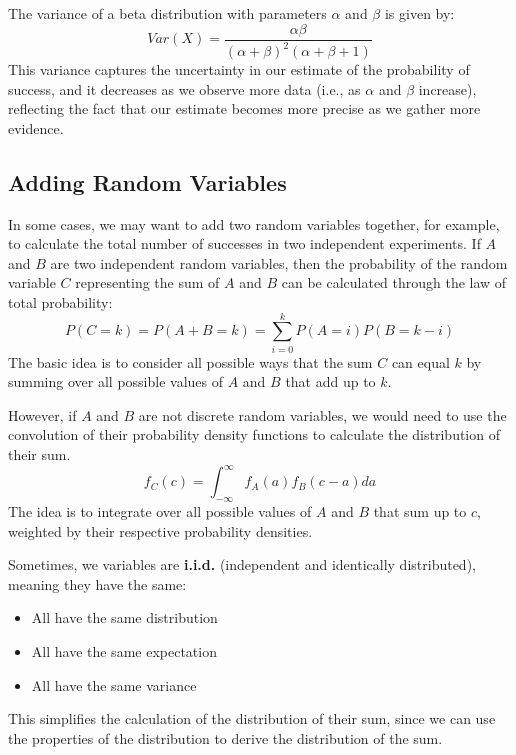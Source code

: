 The variance of a beta distribution with parameters $\alpha$ and $\beta$ is given by:
\begin{equation}
    Var(X) = \frac{\alpha \beta}{(\alpha + \beta)^2 (\alpha + \beta + 1)}
\end{equation}
This variance captures the uncertainty in our estimate of the probability of success, and it decreases as we observe more data (i.e., as $\alpha$ and $\beta$ increase), 
reflecting the fact that our estimate becomes more precise as we gather more evidence.

\subsection{Adding Random Variables}
In some cases, we may want to add two random variables together, for example, to calculate the total number of successes in two independent experiments.
If $A$ and $B$ are two independent random variables, then the probability of the random variable $C$ representing the sum of $A$ and $B$ can be calculated through the law of total probability:
\begin{equation}
    P(C=k) = P(A+B=k) = \sum_{i=0}^{k} P(A=i) P(B=k-i)
\end{equation}
The basic idea is to consider all possible ways that the sum $C$ can equal $k$ by summing over all possible values of $A$ and $B$ that add up to $k$.

However, if $A$ and $B$ are not discrete random variables, we would need to use the convolution of their probability density functions to calculate the distribution of their sum.
\begin{equation}
    f_C(c) = \int_{-\infty}^{\infty} f_A(a) f_B(c - a) da
\end{equation}
The idea is to integrate over all possible values of $A$ and $B$ that sum up to $c$, weighted by their respective probability densities.

Sometimes, we variables are \textbf{i.i.d.} (independent and identically distributed), meaning they have the same:
\begin{itemize}
    \item All have the same distribution
    \item All have the same expectation
    \item All have the same variance
\end{itemize}
This simplifies the calculation of the distribution of their sum, since we can use the properties of the distribution to derive the distribution of the sum.

